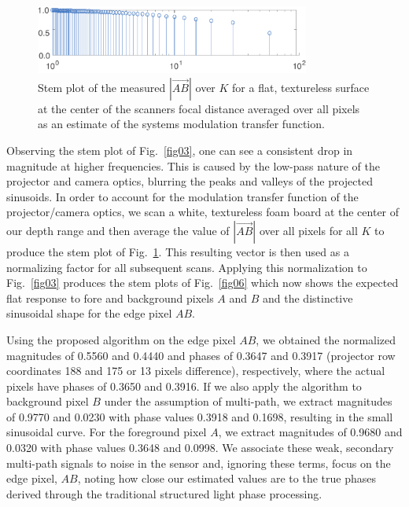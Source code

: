 \documentclass[10pt]{article}
\begin{document}
\begin{figure}[!b]
\centering\includegraphics[width=3.55in]{Figures/figure04}
\caption{Stem plot of the measured $|\vec{AB}|$ over $K$ for a flat, textureless surface at the center of the scanners focal distance averaged over all pixels as an estimate of the systems modulation transfer function.}
\label{fig04}
\end{figure}

Observing the stem plot of Fig.~\ref{fig03}, one can see a consistent drop in magnitude at higher frequencies.  This is caused by the low-pass nature of the projector and camera optics, blurring the peaks and valleys of the projected sinusoids.  In order to account for the modulation transfer function of the projector/camera optics, we scan a white, textureless foam board at the center of our depth range and then average the value of $|\vec{AB}|$ over all pixels for all $K$ to produce the stem plot of Fig.~\ref{fig04}.  This resulting vector is then used as a normalizing factor for all subsequent scans. Applying this normalization to Fig.~\ref{fig03} produces the stem plots of Fig.~\ref{fig06} which now shows the expected flat response to fore and background pixels $A$ and $B$ and the distinctive sinusoidal shape for the edge pixel $AB$. 

Using the proposed algorithm on the edge pixel $AB$, we obtained the normalized magnitudes of 0.5560 and 0.4440 and phases of 0.3647 and 0.3917 (projector row coordinates 188 and 175 or 13 pixels difference), respectively, where the actual pixels have phases of 0.3650 and 0.3916.  If we also apply the algorithm to background pixel $B$ under the assumption of multi-path, we extract magnitudes of 0.9770 and 0.0230 with phase values 0.3918 and 0.1698, resulting in the small sinusoidal curve.  For the foreground pixel $A$, we extract magnitudes of 0.9680 and 0.0320 with phase values 0.3648 and 0.0998.  We associate these weak, secondary multi-path signals to noise in the sensor and, ignoring these terms, focus on the edge pixel, $AB$, noting how close our estimated values are to the true phases derived through the traditional structured light phase processing.
\end{document}
